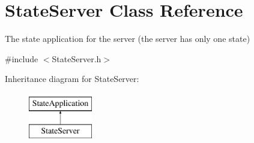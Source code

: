 \hypertarget{class_state_server}{\section{State\-Server Class Reference}
\label{class_state_server}
}


The state application for the server (the server has only one state)  




{\ttfamily \#include $<$State\-Server.\-h$>$}

Inheritance diagram for State\-Server\-:\begin{figure}[H]
\begin{center}
\leavevmode
\includegraphics[height=2.000000cm]{class_state_server}
\end{center}
\end{figure}
